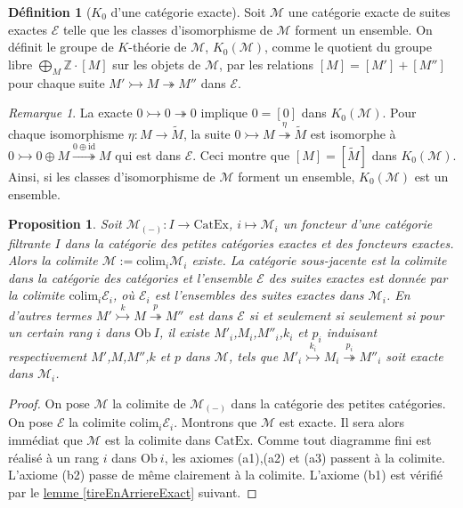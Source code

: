 \documentclass{amsart}
\newcommand{\sref}[2]{\hyperref[#2]{#1 \ref*{#2}}}
\theoremstyle{plain}
\newtheorem{prop}[theo]{Proposition}
\theoremstyle{definition}
\newtheorem{defi}[theo]{Définition}
\theoremstyle{remark}
\newtheorem{rem}[theo]{Remarque}
\newcommand{\ensemblenombre }[1]{\mathbb{#1}}
\newcommand{\Z}{\ensemblenombre{Z}}
\newcommand{\M}{\mathcal{M}}
\newcommand{\E}{\mathcal{E}}
\newcommand{\Ob}[1]{\mathrm{Ob}\:#1}
\newcommand{\id}{\mathrm{id}}
\newcommand{\CatEx}{\mathrm{CatEx}}
\newcommand{\colim}{\mathrm{colim}}
\newcommand{\xrightarrowtail}[1]{\overset{#1}{\rightarrowtail}}
\newcommand{\xtwoheadrightarrow}[1]{\overset{#1}{\twoheadrightarrow}}
\newcommand{\ra}{\rightarrow}
\newcommand{\exac}[3]{{#1}\rightarrowtail {#2}\twoheadrightarrow {#3}}
\newcommand{\exacname}[5]{{#1}\xrightarrowtail{#2} {#3}\xtwoheadrightarrow{#4} {#5}}
\begin{document}
\begin{defi}[$K_0$ d'une catégorie exacte]
  Soit $\M$ une catégorie exacte de suites exactes $\E$ telle que les classes d'isomorphisme de $\M$ forment un ensemble.
  On définit le groupe de $K$-théorie de $\M$, $K_0(\M)$, comme le quotient du groupe libre $\bigoplus_M\Z\cdot [M]$ sur les objets de $\M$, par les relations
  $[M]=[M']+[M'']$ pour chaque suite $\exac{M'}{M}{M''}$ dans $\E$.
\end{defi}

\begin{rem}
  La exacte $\exac{0}{0}{0}$ implique $0=[0]$ dans $K_0(\M)$. Pour chaque isomorphisme $\eta:M\ra\tilde{M}$,
  la suite $\exacname{0}{}{M}{\eta}{\tilde{M}}$ est isomorphe à $\exacname{0}{}{0\oplus M}{0\oplus\id}{M}$
  qui est dans $\E$. Ceci montre que $[M]=[\tilde{M}]$ dans $K_0(\M)$. Ainsi, si les classes d'isomorphisme de $\M$ forment un ensemble,
  $K_0(\M)$ est un ensemble.
\end{rem}

\begin{prop}\label{CatExColimites}
  Soit $\M_{(-)}:I\ra \CatEx$, $i\mapsto \M_i$ un foncteur d'une catégorie filtrante $I$ dans la catégorie des petites catégories exactes
  et des foncteurs exactes. Alors la colimite $\M:=\colim_i\M_i$ existe. La catégorie sous-jacente est la colimite dans la catégorie des catégories
  et l'ensemble $\E$ des suites exactes est donnée par la colimite $\colim_i\E_i$, où $\E_i$ est l'ensembles des suites exactes dans $\M_i$.
  En d'autres termes $\exacname{M'}{k}{M}{p}{M''}$ est dans $\E$ si et seulement si seulement si pour un certain
  rang $i$ dans $\Ob{I}$, il existe $M'_i$,$M_i$,$M''_i$,$k_i$ et $p_i$  induisant respectivement $M'$,$M$,$M''$,$k$ et $p$ dans $\M$,
  tels que $\exacname{M'_i}{k_i}{M_i}{p_i}{M''_i}$ soit exacte dans $\M_i$.
\end{prop}
\begin{proof}
  On pose $\M$ la colimite de $\M_{(-)}$ dans la catégorie des petites catégories. On pose $\E$ la colimite $\colim_i\E_i$.
  Montrons que $\M$ est exacte. Il sera alors immédiat que $\M$ est la colimite dans $\CatEx$.
  Comme tout diagramme fini est réalisé à un rang $i$ dans $\Ob{i}$, les axiomes (a1),(a2) et (a3) passent à la colimite.
  L'axiome (b2) passe de même clairement à la colimite. L'axiome (b1) est vérifié par le \sref{lemme}{tireEnArriereExact} suivant. 
\end{proof}
\end{document}
